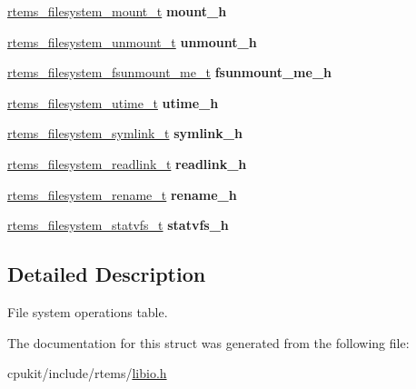 \begin{DoxyCompactItemize}
\mbox{\hyperlink{group__LibIOFSOps_ga1836d0f226aaaf7d7a94231dadb42663}{rtems\+\_\+filesystem\+\_\+mount\+\_\+t}} {\bfseries mount\+\_\+h}
\item 
\mbox{\label{struct__rtems__filesystem__operations__table_a0e895b67058f79076b7dfcc4ab54f5ee}} 
\mbox{\hyperlink{group__LibIOFSOps_ga4eab60ad75d332e4ee4b1ee7ffb95690}{rtems\+\_\+filesystem\+\_\+unmount\+\_\+t}} {\bfseries unmount\+\_\+h}
\item 
\mbox{\label{struct__rtems__filesystem__operations__table_af734ffad68df230c79baf30b7b28ba97}} 
\mbox{\hyperlink{group__LibIOFSOps_ga2f385e23e8448df4e51240f8377aac43}{rtems\+\_\+filesystem\+\_\+fsunmount\+\_\+me\+\_\+t}} {\bfseries fsunmount\+\_\+me\+\_\+h}
\item 
\mbox{\label{struct__rtems__filesystem__operations__table_a7470a1ae313a3f858a78730f0f48f217}} 
\mbox{\hyperlink{group__LibIOFSOps_ga7b4bd5a75a776c42f1e09159406e2c94}{rtems\+\_\+filesystem\+\_\+utime\+\_\+t}} {\bfseries utime\+\_\+h}
\item 
\mbox{\label{struct__rtems__filesystem__operations__table_ad68058798fe355468a87f52ff1faa176}} 
\mbox{\hyperlink{group__LibIOFSOps_gaf21fe2af848bab4061fd62dd0f60522f}{rtems\+\_\+filesystem\+\_\+symlink\+\_\+t}} {\bfseries symlink\+\_\+h}
\item 
\mbox{\label{struct__rtems__filesystem__operations__table_a16bb26195eaf066464e44f6029494b51}} 
\mbox{\hyperlink{group__LibIOFSOps_ga811a6b3bc7b01155f7b585a8eae29177}{rtems\+\_\+filesystem\+\_\+readlink\+\_\+t}} {\bfseries readlink\+\_\+h}
\item 
\mbox{\label{struct__rtems__filesystem__operations__table_a537908157a6707420b51d9b4a8779c89}} 
\mbox{\hyperlink{group__LibIOFSOps_ga6b92b1f0dc00c743d3fc99cebbeb22bf}{rtems\+\_\+filesystem\+\_\+rename\+\_\+t}} {\bfseries rename\+\_\+h}
\item 
\mbox{\label{struct__rtems__filesystem__operations__table_adcb15e98e27647ca8b26eac729542cba}} 
\mbox{\hyperlink{group__LibIOFSOps_ga0866278bfe736fad7750e3e89c5fc93b}{rtems\+\_\+filesystem\+\_\+statvfs\+\_\+t}} {\bfseries statvfs\+\_\+h}
\end{DoxyCompactItemize}


\subsection{Detailed Description}
File system operations table. 

The documentation for this struct was generated from the following file\+:\begin{DoxyCompactItemize}
\item 
cpukit/include/rtems/\mbox{\hyperlink{libio_8h}{libio.\+h}}\end{DoxyCompactItemize}
